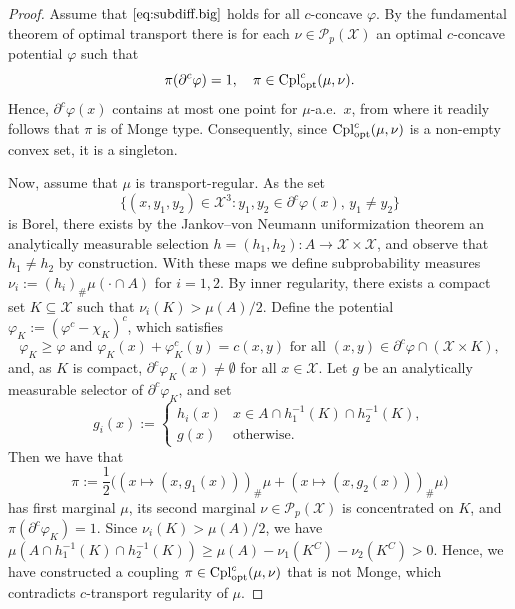 \documentclass[a4paper]{amsart}
\numberwithin{theorem}{section}
\theoremstyle{definition}
\newcommand{\cpl}{\textup{Cpl}}
\newcommand{\Pc}{\mathcal P}
\newcommand{\cplopt}{\cpl_{\rm opt}}
\renewcommand{\phi}{\varphi}
\begin{document}
\begin{proof}
    Assume that $\eqref{eq:subdiff.big}$ holds for all $c$-concave $\phi$.
    By the fundamental theorem of optimal transport there is for each $\nu \in \Pc_p(\mathcal X)$ an optimal $c$-concave potential $\phi$ such that
    \[
        \pi(\partial^c \phi) = 1, \quad \pi \in \cplopt^c(\mu,\nu). 
    \]
    Hence, $\partial^c \phi(x)$ contains at most one point for $\mu$-a.e.\ $x$, from where it readily follows that $\pi$  
    is of Monge type.
    Consequently, since $\cplopt^c(\mu,\nu)$ is a non-empty convex set, it is a singleton.

    Now, assume that $\mu$ is transport-regular.
    As the set 
    \[
        \{ (x,y_1,y_2) \in \mathcal X^3 : y_1,y_2 \in \partial^c\phi(x),\, y_1 \neq y_2\}
    \]
    is Borel, there exists by the Jankov--von Neumann uniformization theorem an analytically measurable selection $h = (h_1,h_2) : A \to \mathcal X \times \mathcal X$, and observe that $h_1 \neq h_2$ by construction.
    With these maps we define subprobability measures $\nu_i := (h_i)_\# \mu( \cdot \cap A)$ for $i = 1,2$.
    By inner regularity, there exists a compact set $K \subseteq \mathcal X$ such that $\nu_i(K) > \mu(A) / 2$.
    Define the potential $\phi_K := (\phi^c - \chi_K)^c$, which satisfies
    \[
        \phi_K \ge \phi \text{ and }
        \phi_K(x) + \phi^c_K(y) = c(x,y) \text{ for all }(x,y) \in \partial^c\phi \cap (\mathcal X \times K),
    \]
    and, as $K$ is compact, $\partial^c \phi_K(x) \neq \emptyset$ for all $x \in \mathcal X$.
    Let $g$ be an analytically measurable selector of $\partial^c \phi_K$, and set
    \[
        g_i(x) := 
        \begin{cases}
            h_i(x) & x \in A \cap h_1^{-1}(K) \cap h_2^{-1}(K), \\
            g(x) & \text{otherwise}.
        \end{cases}
    \]
    Then we have that
    \[
        \pi := \frac12 \big( (x \mapsto (x,g_1(x)))_\# \mu + (x \mapsto (x,g_2(x)))_\# \mu \big)
    \]
    has first marginal $\mu$, its second marginal $\nu \in \Pc_p(\mathcal X)$ is concentrated on $K$, and $\pi(\partial^c \phi_K) = 1$.
    Since $\nu_i(K) > \mu(A)/2$, we have $\mu(A \cap h_1^{-1}(K) \cap h_2^{-1}(K)) \ge \mu(A) - \nu_1(K^C) - \nu_2(K^C) > 0$.
    Hence, we have constructed a coupling $\pi \in \cplopt^c(\mu,\nu)$ that is not Monge, which contradicts $c$-transport regularity of $\mu$.
\end{proof}
\end{document}
